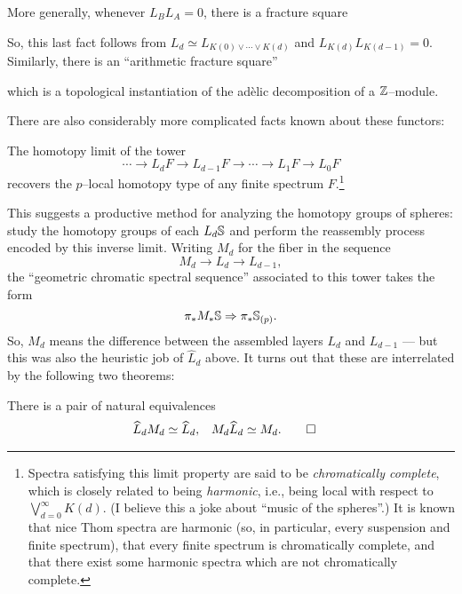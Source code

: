 \begin{remark}
More generally, whenever $L_B L_A = 0$, there is a fracture square
\begin{center}
\end{center}
So, this last fact follows from $L_d \simeq L_{K(0) \vee \cdots \vee K(d)}$ and $L_{K(d)} L_{K(d-1)} = 0$.  Similarly, there is an ``arithmetic fracture square''
\begin{center}
\end{center}
which is a topological instantiation of the ad\`elic decomposition of a $\Z$--module.
\end{remark}

There are also considerably more complicated facts known about these functors:
\begin{theorem}
The homotopy limit of the tower \[\cdots \to L_d F \to L_{d-1} F \to \cdots \to L_1 F \to L_0 F\] recovers the $p$--local homotopy type of any finite spectrum $F$.\footnote{Spectra satisfying this limit property are said to be \textit{chromatically complete}, which is closely related to being \textit{harmonic}, i.e., being local with respect to $\bigvee_{d=0}^\infty K(d)$.  (I believe this a joke about ``music of the spheres''.)  It is known that nice Thom spectra are harmonic (so, in particular, every suspension and finite spectrum), that every finite spectrum is chromatically complete, and that there exist some harmonic spectra which are not chromatically complete.}
\end{theorem}

\noindent This suggests a productive method for analyzing the homotopy groups of spheres: study the homotopy groups of each $L_d \S$ and perform the reassembly process encoded by this inverse limit.  Writing $M_d$ for the fiber in the sequence \[M_d \to L_d \to L_{d-1},\] the ``geometric chromatic spectral sequence'' associated to this tower takes the form \[\pi_* M_* \S \Rightarrow \pi_* \S_{(p)}.\]  So, $M_d$ means the difference between the assembled layers $L_d$ and $L_{d-1}$ --- but this was also the heuristic job of $\widehat L_d$ above.  It turns out that these are interrelated by the following two theorems:
\begin{theorem}
There is a pair of natural equivalences
\begin{align*}
\widehat L_d M_d & \simeq \widehat L_d, &
M_d \widehat L_d & \simeq M_d.
\qed
\end{align*}
\end{theorem}


